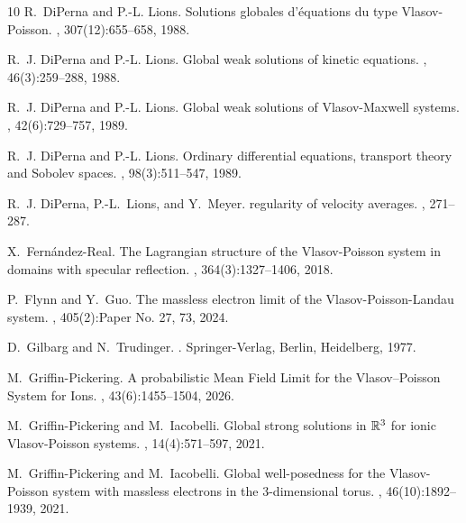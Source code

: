 \documentclass[11pt,reqno,a4paper]{amsart}
\theoremstyle{definition}
\theoremstyle{remark}
\numberwithin{equation}{section}
\begin{document}
\begin{thebibliography}{10}
R.~DiPerna and P.-L. Lions.
\newblock Solutions globales d'\'{e}quations du type {V}lasov-{P}oisson.
, 307(12):655--658,
  1988.

R.~J. DiPerna and P.-L. Lions.
\newblock Global weak solutions of kinetic equations.
, 46(3):259--288, 1988.

R.~J. DiPerna and P.-L. Lions.
\newblock Global weak solutions of {V}lasov-{M}axwell systems.
, 42(6):729--757, 1989.

R.~J. DiPerna and P.-L. Lions.
\newblock Ordinary differential equations, transport theory and {S}obolev
  spaces.
, 98(3):511--547, 1989.

R.~J. DiPerna, P.-L.~Lions, and Y.~Meyer.
 regularity of velocity averages.
, 271--287.

X.~Fern\'andez-Real.
\newblock The {L}agrangian structure of the {V}lasov-{P}oisson system in
  domains with specular reflection.
, 364(3):1327--1406, 2018.

P.~Flynn and Y.~Guo.
\newblock The massless electron limit of the {V}lasov-{P}oisson-{L}andau
  system.
, 405(2):Paper No. 27, 73, 2024.

D.~Gilbarg and N.~Trudinger.
.
\newblock Springer-Verlag, Berlin, Heidelberg, 1977.

M.~Griffin-Pickering.
\newblock A probabilistic {M}ean {F}ield {L}imit for the {V}lasov--{P}oisson
  {S}ystem for {I}ons.
, 43(6):1455--1504, 2026.

M.~Griffin-Pickering and M.~Iacobelli.
\newblock Global strong solutions in {$\Bbb R^3$} for ionic {V}lasov-{P}oisson
  systems.
, 14(4):571--597, 2021.

M.~Griffin-Pickering and M.~Iacobelli.
\newblock Global well-posedness for the {V}lasov-{P}oisson system with massless
  electrons in the 3-dimensional torus.
, 46(10):1892--1939, 2021.


\end{thebibliography}
\end{document}
